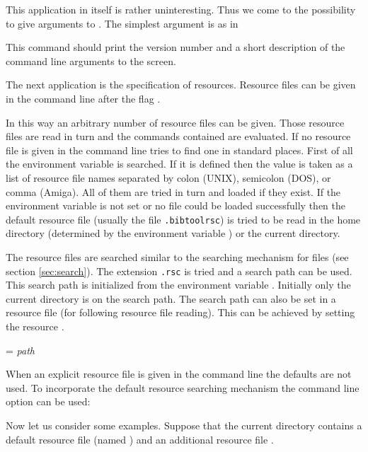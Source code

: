 \documentclass[11pt,a4paper]{scrbook}
\begin{document}
This application in itself is rather uninteresting. Thus we come to the
possibility to give arguments to \BibTool. The simplest argument is  as
in

\sh[h]{}

This command should print the version number and a short description of the
command line arguments to the screen.

The next application is the specification of resources. Resource files can be
given in the command line after the flag .


In this way an arbitrary number of resource files can be given. Those resource
files are read in turn and the commands contained are evaluated. If no
resource file is given in the command line \BibTool{} tries to find one in
standard places. First of all the environment variable  is
searched. If it is defined then the value is taken as a list of resource file
names separated by colon (UNIX), semicolon (DOS), or comma (Amiga). All of
them are tried in turn and loaded if they exist. If the environment variable
is not set or no file could be loaded successfully then the default resource
file (usually the file \texttt{.bibtoolrsc}) is tried to be read in the home
directory (determined by the environment variable ) or the current
directory.

The resource files are searched similar to the searching mechanism for
\BibTeX{} files (see section \ref{sec:search}). The extension \texttt{.rsc} is
tried and a search path can be used. This search path is initialized from the
environment variable . Initially only the current directory is on
the search path. The search path can also be set in a resource file (for
following resource file reading). This can be achieved by setting the resource
.

\begin{Resources}
   = \emph{path}
\end{Resources}

When an explicit resource file is given in the command line the defaults are
not used. To incorporate the default resource searching mechanism the command
line option  can be used:

\sh[R]{}

Now let us consider some examples. Suppose that the current directory contains
a default resource file (named ) and an additional resource
file .
\end{document}
